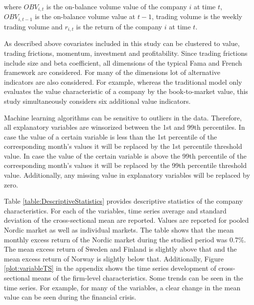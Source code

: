 \documentclass[12pt]{article}
\begin{document}
where $OBV_{i, t}$ is the on-balance volume value of the company $i$ at time $t$, $OBV_{i, t-1}$ is the on-balance volume value at $t-1$, trading volume is the weekly trading volume and $r_{i, t}$ is the return of the company $i$ at time $t$.\footnotemark {} \par

As described above covariates included in this study can be clustered to value, trading frictions, momentum, investment and profitability. Since trading frictions include size and beta coefficient, all dimensions of the typical Fama and French framework are considered. For many of the dimensions lot of alternative indicators are also considered. For example, whereas the traditional \citet{FAMA19933} model only evaluates the value characteristic of a company by the book-to-market value, this study simultaneously considers six additional value indicators.\footnotemark {} \par

Machine learning algorithms can be sensitive to outliers in the data. Therefore, all explanatory variables are winsorized between the 1st and 99th percentiles. In case the value of a certain variable is less than the 1st percentile of the corresponding month's values it will be replaced by the 1st percentile threshold value. In case the value of the certain variable is above the 99th percentile of the corresponding month's values it will be replaced by the 99th percentile threshold value. %
Additionally, any missing value in explanatory variables will be replaced by zero. \par

Table \ref{table:DescriptiveStatistics} provides descriptive statistics of the company characteristics. For each of the variables, time series average and standard deviation of the cross-sectional mean are reported. Values are reported for pooled Nordic market as well as individual markets. The table shows that the mean monthly excess return of the Nordic market during the studied period was 0.7\%. The mean excess return of Sweden and Finland is slightly above that and the mean excess return of Norway is slightly below that. Additionally, Figure \ref{plot:variableTS} in the appendix shows the time series development of cross-sectional means of the firm-level characteristics. Some trends can be seen in the time series. For example, for many of the variables, a clear change in the mean value can be seen during the financial crisis. 
\end{document}

